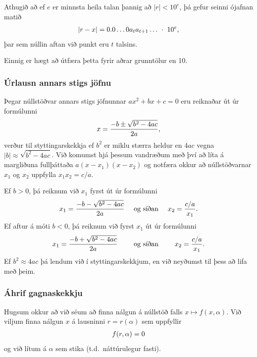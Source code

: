 \documentclass[a4paper,10pt,icelandic]{sphinxmanual}
\begin{document}
Athugið að ef \(e\) er minnsta heila talan þannig að
\(|r|<10^e\), þá gefur seinni ójafnan matið
\begin{gather}
\begin{split}|r-x| = 0.0\dots 0 a_t a_{t+1}\ldots \ \cdot\  10^e,\end{split}\notag
\end{gather}
þar sem núllin aftan við punkt eru \(t\) talsins.

Einnig er hægt að útfæra þetta fyrir aðrar grunntölur en 10.


\subsubsection{Úrlausn annars stigs jöfnu}
\label{kafli01:index-11}\label{kafli01:urlausn-annars-stigs-jofnu}
Þegar núllstöðvar annars stigs jöfnunnar \(ax^2+bx+c=0\) eru
reiknaðar út úr formúlunni
\begin{gather}
\begin{split}x = \dfrac{-b\pm\sqrt{b^2-4ac}}{2a},\end{split}\notag
\end{gather}
verður til styttingarskekkja ef \(b^2\) er miklu stærra heldur en
\(4ac\) vegna \(|b|\approx\sqrt{b^2-4ac}\). Við komumst hjá
þessum vandræðum með því að líta á margliðuna fullþáttaða
\(a(x-x_1)(x-x_2)\) og notfæra okkur að núllstöðvarnar \(x_1\)
og \(x_2\) uppfylla \(x_1x_2=c/a\).

Ef \(b>0\), þá reiknum við \(x_1\) fyrst út úr formúlunni
\begin{gather}
\begin{split}x_1 = \dfrac{-b-\sqrt{b^2-4ac}}{2a}
    \quad \text{ og  síðan } \quad
    x_2 = \dfrac{c/a}{x_1}.\end{split}\notag
\end{gather}
Ef aftur á móti \(b<0\), þá reiknum við fyrst \(x_1\) út úr
formúlunni
\begin{gather}
\begin{split}x_1 = \dfrac{-b+\sqrt{b^2-4ac}}{2a}
    \qquad \text{ og síðan } \qquad
    x_2 = \dfrac{c/a}{x_1}.\end{split}\notag
\end{gather}
Ef \(b^2\approx 4ac\) þá lendum við í styttingarskekkjum, en við
neyðumst til þess að lifa með þeim.


\subsubsection{Áhrif gagnaskekkju}
\label{kafli01:index-12}\label{kafli01:ahrif-gagnaskekkju}
Hugsum okkur að við séum að finna nálgun á núllstöð falls
\(x\mapsto f(x,\alpha)\). Við viljum finna nálgun \(x\) á
lausninni \(r=r(\alpha)\) sem uppfyllir
\begin{gather}
\begin{split}f(r,\alpha) = 0\end{split}\notag
\end{gather}
og við lítum á \(\alpha\) sem stika (t.d. náttúrulegur fasti).
\end{document}
